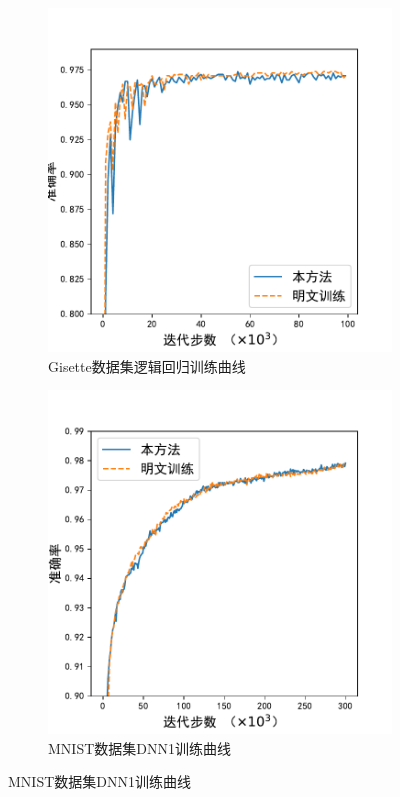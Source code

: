 \begin{figure}[h!]
    \centering
    \begin{subfigure}[b]{0.47\linewidth}
    \centering
    \includegraphics[width=\linewidth]{Z_Resources/ss-perm_lr.pdf}
    \caption{Gisette数据集逻辑回归训练曲线}
    \end{subfigure}
    \begin{subfigure}[b]{0.47\linewidth}
    \centering
    \includegraphics[width=\linewidth]{Z_Resources/ss-perm_dnn1.pdf}
    \caption{MNIST数据集DNN1训练曲线}
    \end{subfigure}
    

\end{figure}
